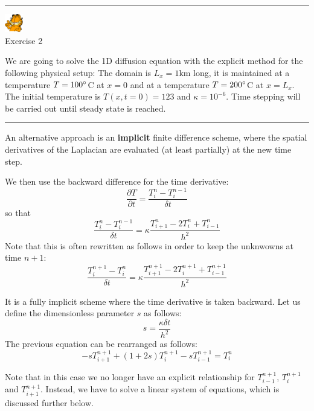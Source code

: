 \begin{center}
\begin{minipage}[t]{0.77\textwidth}
\par\noindent\rule{\textwidth}{0.4pt}

\begin{center}
\includegraphics[width=0.8cm]{images/garftr} \\
{\color{orange}Exercise 2}
\end{center}

We are going to solve the 1D diffusion equation with the explicit method
for the following physical setup: The domain is $L_x=1$km long, 
it is maintained at a temperature $T=100\degree$C at $x=0$ and at a temperature
$T=200\degree$C at $x=L_x$. The initial temperature is $T(x,t=0)=123$
and $\kappa=10^{-6}$. 
Time stepping will be carried out until steady state is reached.

\par\noindent\rule{\textwidth}{0.4pt}
\end{minipage}
\end{center}

An alternative approach is an {\bf implicit} finite difference scheme, where the spatial derivatives
of the Laplacian are evaluated (at least partially) at the new time step.

We then use the backward difference for the time derivative:
\[
\frac{\partial T}{\partial t} 
= \frac{T_{i}^{n}-T_i^{n-1}}{\delta t} 
\]
so that
\[
\frac{T_{i}^{n}-T_i^{n-1}}{\delta t} 
= \kappa \frac{T_{i+1}^n - 2T_i^n + T_{i-1}^n}{h^2}
\]
Note that this is often rewritten as follows in order to keep the unknwowns at time $n+1$:
\[
\frac{T_{i}^{n+1}-T_i^{n}}{\delta t} 
= \kappa \frac{T_{i+1}^{n+1} - 2T_i^{n+1} + T_{i-1}^{n+1}}{h^2}
\]

It is a fully implicit scheme where the time derivative is taken backward.
Let us define the dimensionless parameter $s$ as follows:
\[
s=\frac{\kappa \delta t}{h^2}
\]
The previous equation can be rearranged as follows:
\[
\boxed{
-s T_{i+1}^{n+1} + (1+2s) T_{i}^{n+1} - s T_{i-1}^{n+1} = T_i^{n}
}
\]

\begin{center}

\end{center}



Note that in this case we no longer have an explicit relationship for 
$T^{n+1}_{i-1}$, $T^{n+1}_i$ and $T^{n+1}_{i+1}$.
Instead, we have to solve a {\color{olive}linear system of equations}, which is discussed further below.

